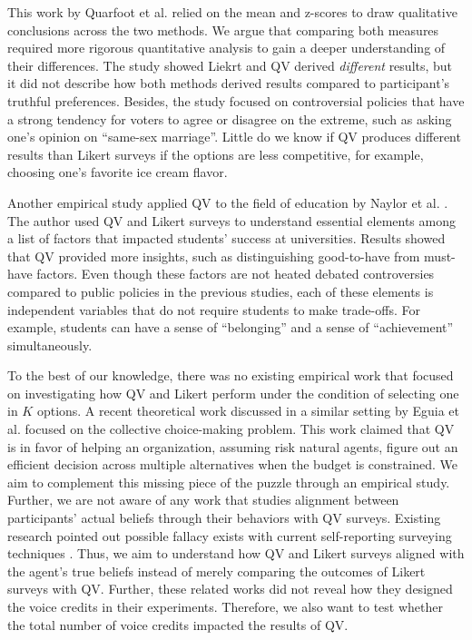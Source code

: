 This work by Quarfoot et al. relied on the mean and z-scores to draw qualitative conclusions across the two methods. We argue that comparing both measures required more rigorous quantitative analysis to gain a deeper understanding of their differences. The study showed Liekrt and QV derived \textit{different} results, but it did not describe how both methods derived results compared to participant's truthful preferences. Besides, the study focused on controversial policies that have a strong tendency for voters to agree or disagree on the extreme, such as asking one's opinion on ``same-sex marriage''. Little do we know if QV produces different results than Likert surveys if the options are less competitive, for example, choosing one's favorite ice cream flavor.\par

Another empirical study applied QV to the field of education by Naylor et al. \cite{naylor2017first}. The author used QV and Likert surveys to understand essential elements among a list of factors that impacted students' success at universities. Results showed that QV provided more insights, such as distinguishing good-to-have from must-have factors. Even though these factors are not heated debated controversies compared to public policies in the previous studies, each of these elements is independent variables that do not require students to make trade-offs. For example, students can have a sense of ``belonging'' and a sense of ``achievement'' simultaneously.

To the best of our knowledge, there was no existing empirical work that focused on investigating how QV and Likert perform under the condition of selecting one in $K$ options. A recent theoretical work discussed in a similar setting by Eguia et al. \cite{eguia2019quadratic} focused on the collective choice-making problem. This work claimed that QV is in favor of helping an organization, assuming risk natural agents, figure out an efficient decision across multiple alternatives when the budget is constrained. We aim to complement this missing piece of the puzzle through an empirical study. Further, we are not aware of any work that studies alignment between participants' actual beliefs through their behaviors with QV surveys. Existing research pointed out possible fallacy exists with current self-reporting surveying techniques \cite{araujo2017much, vavreck2007exaggerated}. Thus, we aim to understand how QV and Likert surveys aligned with the agent's true beliefs instead of merely comparing the outcomes of Likert surveys with QV. Further, these related works did not reveal how they designed the voice credits in their experiments. Therefore, we also want to test whether the total number of voice credits impacted the results of QV. 

